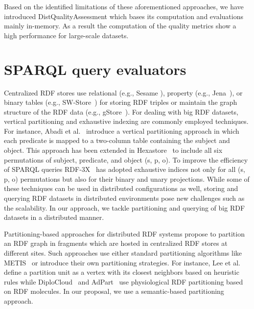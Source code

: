 Based on the identified limitations of these aforementioned approaches, we have introduced DistQualityAssessment which bases its computation and evaluations mainly in-memory.
As a result the computation of the quality metrics show a high performance for large-scale datasets.

\section{SPARQL query evaluators}

Centralized RDF stores use relational (e.g., Sesame \cite{BroekstraKH02}), property (e.g., Jena~\cite{Wilkinson06}), or binary tables (e.g., SW-Store~\cite{AbadiMMH09}) for storing RDF triples or maintain the graph structure of the RDF data (e.g., gStore~\cite{ZouMCOZ11}). 
For dealing with big RDF datasets, vertical partitioning and exhaustive indexing are commonly employed techniques. 
For instance, Abadi et al.~\cite{AbadiMMH07} introduce a vertical partitioning approach in which each predicate is mapped to a two-column table containing the subject and object. 
This approach has been extended in Hexastore~\cite{WeissKB08} to include all six permutations of subject, predicate, and object (s, p, o). 
To improve the efficiency of SPARQL queries RDF-3X~\cite{NeumannW10} has adopted exhaustive indices not only for all (s, p, o) permutations but also for their binary and unary projections. 
While some of these techniques can be used in distributed configurations as well, storing and querying RDF datasets in distributed environments pose new challenges such as the scalability. 
In our approach, we tackle partitioning and querying of big RDF datasets in a distributed manner.

Partitioning-based approaches for distributed RDF systems propose to partition an RDF graph in fragments which are hosted in centralized RDF stores at different sites. 
Such approaches use either standard partitioning algorithms like METIS~\cite{GurajadaSMT14} or introduce their own partitioning strategies. 
For instance, Lee et al.~\cite{LeeL2013} define a partition unit as a vertex with its closest neighbors based on heuristic rules while DiploCloud~\cite{WylotC16} and AdPart~\cite{harbi2016accelerating} use physiological RDF partitioning based on RDF molecules. 
In our proposal, we use a semantic-based partitioning approach.

